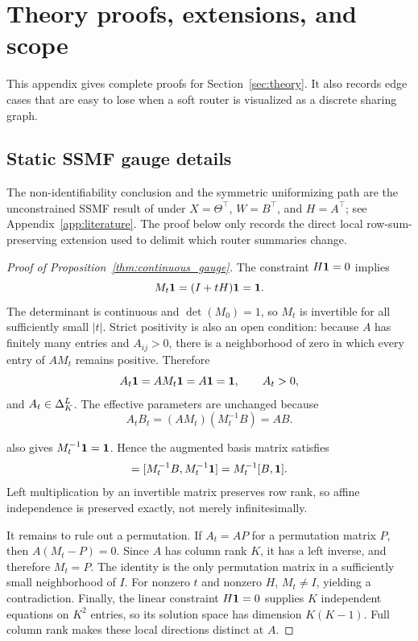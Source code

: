 \section{Theory proofs, extensions, and scope}
\label{app:theory}

This appendix gives complete proofs for Section~\ref{sec:theory}.  It also
records edge cases that are easy to lose when a soft router is visualized as a
discrete sharing graph.

\subsection{Static SSMF gauge details}
\label{app:gauge_proof}

The non-identifiability conclusion and the symmetric uniformizing path are
the unconstrained SSMF result of
\citet[Section~IV-A]{vuthanh2023bounded} under
\(X=\Theta^\top\), \(W=B^\top\), and \(H=A^\top\); see
Appendix~\ref{app:literature}.  The proof below only records the direct local
row-sum-preserving extension used to delimit which router summaries change.

\begin{proof}[Proof of Proposition~\ref{thm:continuous_gauge}]
The constraint $H\mathbf{1}=0$ implies
\begin{equation}
  M_t\mathbf{1}=(I+tH)\mathbf{1}=\mathbf{1}.
  \label{eq:app_rowsum}
\end{equation}
The determinant is continuous and $\det(M_0)=1$, so $M_t$ is invertible for
all sufficiently small $|t|$.  Strict positivity is also an open condition:
because $A$ has finitely many entries and $A_{ij}>0$, there is a neighborhood
of zero in which every entry of $AM_t$ remains positive.  Therefore
\begin{equation}
  A_t\mathbf{1}=AM_t\mathbf{1}=A\mathbf{1}=\mathbf{1},
  \qquad A_t>0,
\end{equation}
and $A_t\in\Delta_K^L$.  The effective parameters are unchanged because
\begin{equation}
  A_tB_t=(AM_t)(M_t^{-1}B)=AB.
\end{equation}

 also gives
$M_t^{-1}\mathbf{1}=\mathbf{1}$.  Hence the augmented basis matrix satisfies
\begin{equation}
 [B_t,\ones]
 =[M_t^{-1}B,M_t^{-1}\ones]
 =M_t^{-1}[B,\ones].
 \label{eq:app_affine_rank}
\end{equation}
Left multiplication by an invertible matrix preserves row rank, so affine
independence is preserved exactly, not merely infinitesimally.

It remains to rule out a permutation.  If $A_t=AP$ for a permutation matrix
$P$, then $A(M_t-P)=0$.  Since $A$ has column rank $K$, it has a left inverse,
and therefore $M_t=P$.  The identity is the only permutation matrix in a
sufficiently small neighborhood of $I$.  For nonzero $t$ and nonzero $H$,
$M_t\ne I$, yielding a contradiction.  Finally, the linear constraint
$H\mathbf{1}=0$ supplies $K$ independent equations on $K^2$ entries, so its
solution space has dimension $K(K-1)$.  Full column rank makes these local
directions distinct at $A$.
\end{proof}

